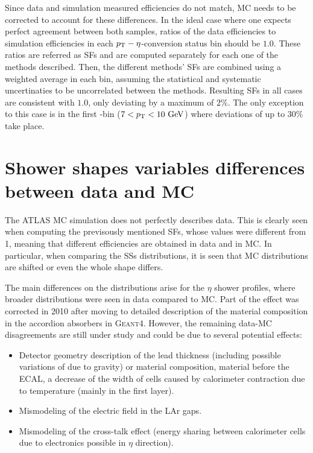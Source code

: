 Since data and simulation measured efficiencies do not match, \ac{MC} needs to be corrected to account for these differences. In the ideal case where one expects perfect agreement between both samples, ratios of the data efficiencies to simulation efficiencies in each \(p_{\text{T}}-\eta\)-conversion status bin should be \(1.0\). These ratios are referred as \acp{SF} and are computed separately for each one of the methods described. Then, the different methods' \acp{SF} are combined using a weighted average in each bin, assuming the statistical and systematic uncertinaties to be uncorrelated between the methods. Resulting \acp{SF} in all cases are consistent with \(1.0\), only deviating by a maximum of \(2\%\). The only exception to this case is in the first \pt-bin (\(7<p_{\text{T}}<10~\text{GeV}\)) where deviations of up to \(30\%\) take place.





\section{Shower shapes variables differences between data and MC}

The \ac{ATLAS} \ac{MC} simulation does not perfectly describes data. This is clearly seen when computing the previsously mentioned \acp{SF}, whose values were different from 1, meaning that different efficiencies are obtained in data and in \ac{MC}. In particular, when comparing the \acp{SS} distributions, it is seen that \ac{MC} distributions are shifted or even the whole shape differs.

The main differences on the distributions arise for the \(\eta\) shower profiles, where broader distributions were seen in data compared to \ac{MC}. Part of the effect was corrected in 2010 after moving to detailed description of the material composition in the accordion absorbers in \textsc{Geant4}. However, the remaining data-\ac{MC} disagreements are still under study and could be due to several potential effects:
\begin{itemize}
    \item Detector geometry description of the lead thickness (including possible variations of due to gravity) or material composition, material before the \ac{ECAL}, a decrease of the width of cells caused by calorimeter contraction due to temperature (mainly in the first layer).
    \item Mismodeling of the electric field in the \ac{LAr} gaps.
    \item Mismodeling of the cross-talk effect (energy sharing between calorimeter cells due to electronics possible in \(\eta\) direction).
\end{itemize}



